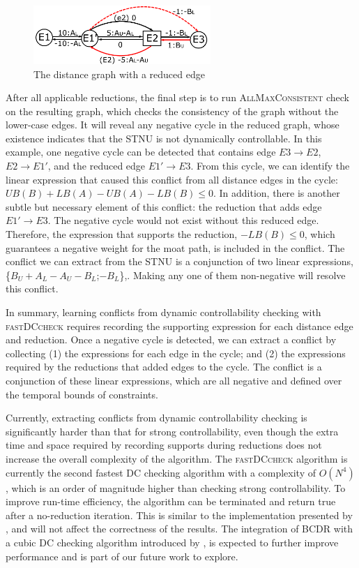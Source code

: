 \documentclass[jair,twoside,11pt,theapa]{article}
\begin{document}
\begin{figure}[htb]
	\centering
	\includegraphics[width=0.6\textwidth]{figures/DC_reductions/dc_reduction4.pdf}
	\caption{The distance graph with a reduced edge}
	\label{fig:dc_reduction4}
\end{figure}


After all applicable reductions, the final step is to run
\textsc{AllMaxConsistent} check on the resulting graph, which checks the
consistency of the graph without the lower-case edges. It will
reveal any negative cycle in the reduced graph, whose existence indicates that
the STNU is not dynamically controllable. In this example, one negative cycle
can be detected that contains edge $E3\rightarrow E2$, $E2\rightarrow E1'$, and
the reduced edge $E1'\rightarrow E3$. From this cycle, we can identify the
linear expression that caused this conflict from all distance edges in the
cycle: $UB(B)+LB(A)-UB(A)-LB(B) \le 0$. In addition, there is another subtle but
necessary element of this conflict: the reduction that adds edge $E1'\rightarrow
E3$. The negative cycle would not exist without this reduced edge. Therefore,
the expression that supports the reduction, $-LB(B) \le 0$, which guarantees a
negative weight for the moat path, is included in the conflict. The conflict we
can extract from the STNU is a conjunction of two linear expressions,
\{$B_U+A_L-A_U-B_L$;$-B_L$\},. Making any one of them non-negative will
resolve this conflict.


In summary, learning conflicts from dynamic controllability checking with
\textsc{fastDCcheck} requires recording the supporting expression for each
distance edge and reduction. Once a negative cycle is detected, we can extract a
conflict by collecting (1) the expressions for each edge in the cycle; and (2)
the expressions required by the reductions that added edges to the cycle. The
conflict is a conjunction of these linear expressions, which are all negative
and defined over the temporal bounds of constraints. 


Currently, extracting conflicts from dynamic controllability checking is
significantly harder than that for strong controllability, even though the extra
time and space required by recording supports during reductions does not
increase the overall complexity of the algorithm. The \textsc{fastDCcheck}
algorithm is currently the second fastest DC checking algorithm with a
complexity of $O(N^4)$, which is an order of magnitude higher than checking
strong controllability. To improve run-time efficiency, the algorithm can be
terminated and return true after a no-reduction iteration. This is similar to
the implementation presented by , and will not affect the
correctness of the results. The integration of BCDR with a cubic DC checking
algorithm introduced by , is expected to further improve
performance and is part of our future work to explore.
\end{document}
